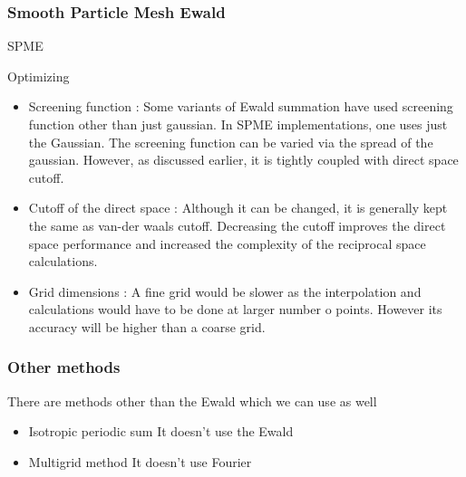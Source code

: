 \documentclass[9pt,bestpractices]{livecoms}
\begin{document}
\subsubsection{Smooth Particle Mesh Ewald}

SPME

Optimizing 
\begin{itemize}
\item Screening function : Some variants of Ewald summation have used screening function other than just gaussian. In SPME implementations, one uses just the Gaussian. The screening function can be varied via the spread of the gaussian.  However, as discussed earlier, it is tightly coupled with direct space cutoff.
\item Cutoff of the direct space : Although it can be changed, it is generally kept the same as van-der waals cutoff. Decreasing the cutoff improves the direct space performance and increased the complexity of the reciprocal space calculations. 
\item Grid dimensions : A fine grid would be slower as the interpolation and calculations would have to be done at larger number o points. However its accuracy will be higher than a coarse grid.
\end{itemize}

\subsubsection{Other methods}

There are methods other than the Ewald which we can use as well 
\begin{itemize}
\item Isotropic periodic sum It doesn't use the Ewald
\item Multigrid method It doesn't use Fourier 
\end{itemize}
\end{document}
